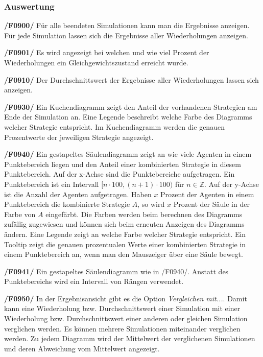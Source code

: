 \subsubsection{Auswertung}

\textbf{/F0900/}
Für alle beendeten Simulationen kann man die Ergebnisse anzeigen. Für jede Simulation lassen sich die Ergebnisse aller Wiederholungen anzeigen.

\textbf{/F0901/}
Es wird angezeigt bei welchen und wie viel Prozent der Wiederholungen ein Gleichgewichtszustand erreicht wurde.


\textbf{/F0910/}
Der Durchschnittswert der Ergebnisse aller Wiederholungen lassen sich anzeigen.

\textbf{/F0930/}
Ein Kuchendiagramm zeigt den Anteil der vorhandenen Strategien am Ende der Simulation an. Eine Legende beschreibt welche Farbe des Diagramms welcher Strategie entspricht. Im Kuchendiagramm werden die genauen Prozentwerte der jeweiligen Strategie angezeigt.

\textbf{/F0940/}
Ein gestapeltes Säulendiagramm zeigt an wie viele Agenten in einem Punktebereich liegen und den Anteil einer kombinierten Strategie in diesem Punktebereich. Auf der x-Achse sind die Punktebereiche aufgetragen. Ein Punktebereich ist ein Intervall $[n \cdot 100, (n+1) \cdot 100)$ für $n \in \mathbb{Z}$. Auf der y-Achse ist die Anzahl der Agenten aufgetragen. Haben $x$ Prozent der Agenten in einem Punktebereich die kombinierte Strategie $A$, so wird $x$ Prozent der Säule in der Farbe von $A$ eingefärbt. Die Farben werden beim berechnen des Diagramms zufällig zugewiesen und können sich beim erneuten Anzeigen des Diagramms ändern. Eine Legende zeigt an welche Farbe welcher Strategie entspricht. Ein Tooltip zeigt die genauen prozentualen Werte einer kombinierten Strategie in einem Punktebereich an, wenn man den Mauszeiger über eine Säule bewegt.

\textbf{/F0941/}
Ein gestapeltes Säulendiagramm wie in /F0940/. Anstatt des Punktebereichs wird ein Intervall von Rängen verwendet.

\textbf{/F0950/}
In der Ergebnisansicht gibt es die Option \emph{Vergleichen mit...}. Damit kann eine Wiederholung bzw. Durchschnittswert einer Simulation mit einer Wiederholung bzw. Durchschnittswert einer anderen oder gleichen Simulation verglichen werden. Es können mehrere Simulationen miteinander verglichen werden. Zu jedem Diagramm wird der Mittelwert der verglichenen Simulationen und deren Abweichung vom Mittelwert angezeigt.

